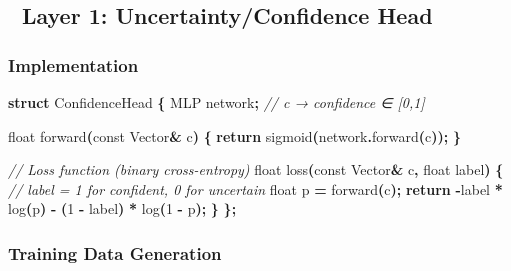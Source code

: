 \documentclass[
  11pt,
  a4paper,
]{article}
\newenvironment{Shaded}{\begin{snugshade}}{\end{snugshade}}
\newcommand{\AttributeTok}[1]{\textcolor[rgb]{0.13,0.29,0.53}{#1}}
\newcommand{\CommentTok}[1]{\textcolor[rgb]{0.56,0.35,0.01}{\textit{#1}}}
\newcommand{\ControlFlowTok}[1]{\textcolor[rgb]{0.13,0.29,0.53}{\textbf{#1}}}
\newcommand{\DataTypeTok}[1]{\textcolor[rgb]{0.13,0.29,0.53}{#1}}
\newcommand{\DecValTok}[1]{\textcolor[rgb]{0.00,0.00,0.81}{#1}}
\newcommand{\KeywordTok}[1]{\textcolor[rgb]{0.13,0.29,0.53}{\textbf{#1}}}
\newcommand{\NormalTok}[1]{#1}
\newcommand{\OperatorTok}[1]{\textcolor[rgb]{0.81,0.36,0.00}{\textbf{#1}}}
\begin{document}
\subsection{🧩 Layer 1: Uncertainty/Confidence
Head}\label{layer-1-uncertaintyconfidence-head}

\subsubsection{Implementation}\label{implementation}

\begin{Shaded}
\begin{Highlighting}[]
\KeywordTok{struct}\NormalTok{ ConfidenceHead }\OperatorTok{\{}
\NormalTok{    MLP network}\OperatorTok{;}  \CommentTok{// c → confidence ∈ [0,1]}
    
    \DataTypeTok{float}\NormalTok{ forward}\OperatorTok{(}\AttributeTok{const}\NormalTok{ Vector}\OperatorTok{\&}\NormalTok{ c}\OperatorTok{)} \OperatorTok{\{}
        \ControlFlowTok{return}\NormalTok{ sigmoid}\OperatorTok{(}\NormalTok{network}\OperatorTok{.}\NormalTok{forward}\OperatorTok{(}\NormalTok{c}\OperatorTok{));}
    \OperatorTok{\}}
    
    \CommentTok{// Loss function (binary cross{-}entropy)}
    \DataTypeTok{float}\NormalTok{ loss}\OperatorTok{(}\AttributeTok{const}\NormalTok{ Vector}\OperatorTok{\&}\NormalTok{ c}\OperatorTok{,} \DataTypeTok{float}\NormalTok{ label}\OperatorTok{)} \OperatorTok{\{}
        \CommentTok{// label = 1 for confident, 0 for uncertain}
        \DataTypeTok{float}\NormalTok{ p }\OperatorTok{=}\NormalTok{ forward}\OperatorTok{(}\NormalTok{c}\OperatorTok{);}
        \ControlFlowTok{return} \OperatorTok{{-}}\NormalTok{label }\OperatorTok{*}\NormalTok{ log}\OperatorTok{(}\NormalTok{p}\OperatorTok{)} \OperatorTok{{-}} \OperatorTok{(}\DecValTok{1} \OperatorTok{{-}}\NormalTok{ label}\OperatorTok{)} \OperatorTok{*}\NormalTok{ log}\OperatorTok{(}\DecValTok{1} \OperatorTok{{-}}\NormalTok{ p}\OperatorTok{);}
    \OperatorTok{\}}
\OperatorTok{\};}
\end{Highlighting}
\end{Shaded}

\subsubsection{Training Data Generation}\label{training-data-generation}
\end{document}
